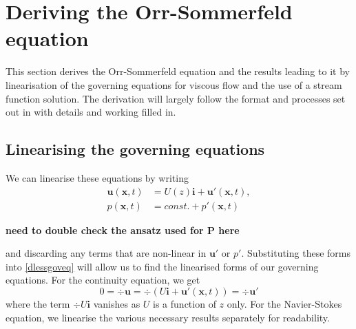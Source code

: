 \chapter{Deriving the Orr-Sommerfeld equation}
\label{chap:oseq}
This section derives the Orr-Sommerfeld equation and the results leading to it by linearisation of the governing equations for viscous flow and the use of a stream function solution. The derivation will largely follow the format and processes set out in \citet{drazin2004hydrodynamic} with details and working filled in.

\section{Linearising the governing equations}
We can linearise these equations by writing 
\begin{align}
    \mathbf{u}(\mathbf{x}, t) &= U(z) \mathbf{i} + \mathbf{u}'(\mathbf{x}, t), \nonumber\\
    p(\mathbf{x}, t) &= const. + p'(\mathbf{x}, t)
\end{align}

\textbf{need to double check the ansatz used for P here}

and discarding any terms that are non-linear in $ \mathbf{u}' $ or  $ p' $.
Substituting these forms into \eqref{dlessgoveq} will allow us to find the linearised forms of our governing equations. For the continuity equation, we get
\begin{equation}
    0 = \div{\mathbf{u}} =  \div{( U \mathbf{i} + \mathbf{u}'(\mathbf{x}, t))} = \div{\mathbf{u}'}
\label{contlin}
\end{equation} 
where the term $ \div{U \mathbf{i}} $ vanishes as $ U $ is a function of $ z $ only.
For the Navier-Stokes equation, we linearise the various necessary results separately for readability. 

